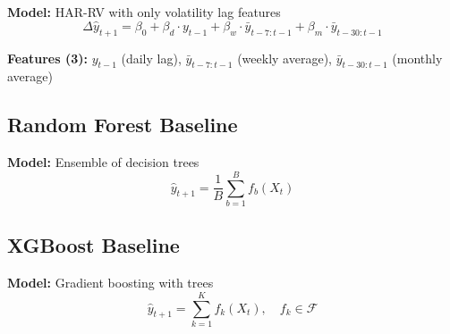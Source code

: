 \documentclass{article}
\begin{document}
\textbf{Model:} HAR-RV with only volatility lag features
\begin{equation}
\Delta \hat{y}_{t+1} = \beta_0 + \beta_d \cdot y_{t-1} + \beta_w \cdot \bar{y}_{t-7:t-1} + \beta_m \cdot \bar{y}_{t-30:t-1}
\end{equation}

\textbf{Features (3):} $y_{t-1}$ (daily lag), $\bar{y}_{t-7:t-1}$ (weekly average), $\bar{y}_{t-30:t-1}$ (monthly average)

\subsection{Random Forest Baseline}

\textbf{Model:} Ensemble of decision trees
\begin{equation}
\hat{y}_{t+1} = \frac{1}{B}\sum_{b=1}^{B} f_b(X_t)
\end{equation}

\subsection{XGBoost Baseline}

\textbf{Model:} Gradient boosting with trees
\begin{equation}
\hat{y}_{t+1} = \sum_{k=1}^{K} f_k(X_t), \quad f_k \in \mathcal{F}
\end{equation}
\end{document}

